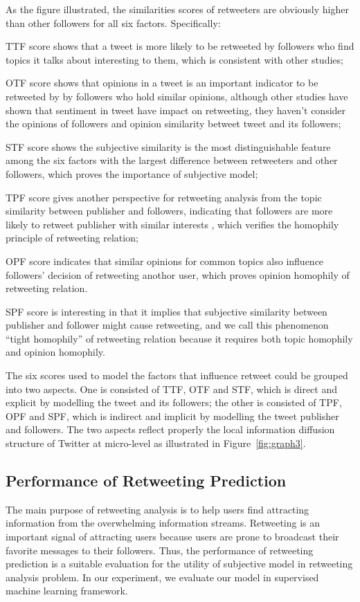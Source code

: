\documentclass{acm_proc_article-sp}
\begin{document}
As the figure illustrated, the similarities scores of retweeters are obviously higher than other followers for all six factors. Specifically: 
\begin{itemize*}
\item TTF score shows that a tweet is more likely to be retweeted by followers who find topics it talks about interesting to them, which is consistent with other studies\cite{conf/icwsm/MacskassyM11, conf/wsdm/FengW13};
\item OTF score shows that opinions in a tweet is an important indicator to be retweeted by by followers who hold similar opinions, although other studies\cite{conf/icwsm/PfitznerGS12,2011:NaveedGKC} have shown that sentiment in tweet have impact on retweeting, they haven't consider the opinions of followers and opinion similarity betweet tweet and its followers;
\item STF score shows the subjective similarity is the most distinguishable feature among the six factors with the largest difference between retweeters and other followers, which proves the importance of subjective model;
\item TPF score gives another perspective for retweeting analysis from the topic similarity between publisher and followers, indicating that followers are more likely to retweet publisher with similar interests , which verifies the homophily principle of retweeting relation;
\item OPF score indicates that similar opinions for common topics also influence followers' decision of retweeting anothor user, which proves opinion homophily of retweeting relation.
\item SPF score is interesting in that it implies that subjective similarity between publisher and follower might cause retweeting, and we call this phenomenon ``tight homophily'' of retweeting relation because it requires both topic homophily and opinion homophily.
\end{itemize*} 
The six scores used to model the factors that influence retweet could be grouped into two aspects. 
One is consisted of TTF, OTF and STF, which is direct and explicit by modelling the tweet and its followers;
the other is consisted of TPF, OPF and SPF, which is indirect and implicit by modelling the tweet publisher and followers.
The two aspects reflect properly the local information diffusion structure of Twitter at micro-level as illustrated in Figure~\ref{fig:graph3}.

\subsection{Performance of Retweeting Prediction}
\label{performance}
The main purpose of retweeting analysis is to help users find attracting information from the overwhelming information streams. 
Retweeting is an important signal of attracting users because users are prone to broadcast their favorite messages to their followers. 
Thus, the performance of retweeting prediction is a suitable evaluation for the utility of subjective model in retweeting analysis problem.
In our experiment, we evaluate our model in supervised machine learning framework.
\end{document}

